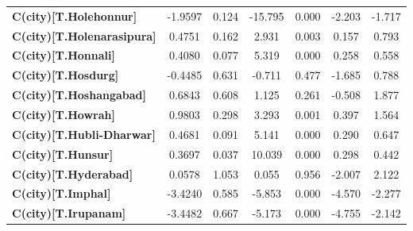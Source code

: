 \begin{center}
\begin{tabular}{lcccccc}
\textbf{C(city)[T.Holehonnur]}                                                                      &      -1.9597  &        0.124     &   -15.795  &         0.000        &       -2.203    &       -1.717     \\
\textbf{C(city)[T.Holenarasipura]}                                                                  &       0.4751  &        0.162     &     2.931  &         0.003        &        0.157    &        0.793     \\
\textbf{C(city)[T.Honnali]}                                                                         &       0.4080  &        0.077     &     5.319  &         0.000        &        0.258    &        0.558     \\
\textbf{C(city)[T.Hosdurg]}                                                                         &      -0.4485  &        0.631     &    -0.711  &         0.477        &       -1.685    &        0.788     \\
\textbf{C(city)[T.Hoshangabad]}                                                                     &       0.6843  &        0.608     &     1.125  &         0.261        &       -0.508    &        1.877     \\
\textbf{C(city)[T.Howrah]}                                                                          &       0.9803  &        0.298     &     3.293  &         0.001        &        0.397    &        1.564     \\
\textbf{C(city)[T.Hubli-Dharwar]}                                                                   &       0.4681  &        0.091     &     5.141  &         0.000        &        0.290    &        0.647     \\
\textbf{C(city)[T.Hunsur]}                                                                          &       0.3697  &        0.037     &    10.039  &         0.000        &        0.298    &        0.442     \\
\textbf{C(city)[T.Hyderabad]}                                                                       &       0.0578  &        1.053     &     0.055  &         0.956        &       -2.007    &        2.122     \\
\textbf{C(city)[T.Imphal]}                                                                          &      -3.4240  &        0.585     &    -5.853  &         0.000        &       -4.570    &       -2.277     \\
\textbf{C(city)[T.Irupanam]}                                                                        &      -3.4482  &        0.667     &    -5.173  &         0.000        &       -4.755    &       -2.142     \\

\end{tabular}
\end{center}
